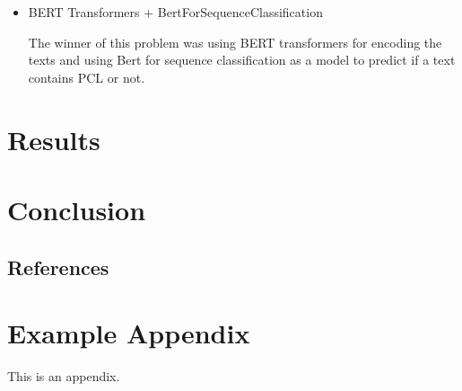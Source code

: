 \documentclass[11pt]{article}
\begin{document}
\begin{itemize}
\item BERT Transformers + BertForSequenceClassification

The winner of this problem was using BERT transformers for encoding the
texts and using Bert for sequence classification as a model to predict if a
text contains PCL or not.
\end{itemize}

\section{Results}

\section{Conclusion}

\subsection{References}

\appendix

\section{Example Appendix}

\label{sec:appendix}

This is an appendix.
\end{document}
